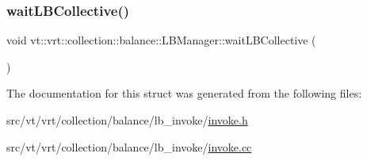 \mbox{\label{structvt_1_1vrt_1_1collection_1_1balance_1_1_l_b_manager_a2923d77f512a955194589450cbb85b80}} 
\subsubsection{\texorpdfstring{wait\+L\+B\+Collective()}{waitLBCollective()}}
{\footnotesize\ttfamily void vt\+::vrt\+::collection\+::balance\+::\+L\+B\+Manager\+::wait\+L\+B\+Collective (\begin{DoxyParamCaption}{ }\end{DoxyParamCaption})}



The documentation for this struct was generated from the following files\+:\begin{DoxyCompactItemize}
\item 
src/vt/vrt/collection/balance/lb\+\_\+invoke/\hyperlink{invoke_8h}{invoke.\+h}\item 
src/vt/vrt/collection/balance/lb\+\_\+invoke/\hyperlink{invoke_8cc}{invoke.\+cc}\end{DoxyCompactItemize}
